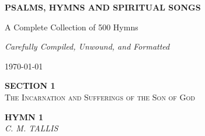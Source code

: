 \documentclass[11pt,a4paper]{article}
\begin{document}
\begin{titlepage}
    \centering
    \vspace*{4cm}
    {\Huge \textbf{PSALMS, HYMNS AND SPIRITUAL SONGS}\par}
    \vspace{1.5cm}
    {\Large A Complete Collection of 500 Hymns\par}
    \vspace{2cm}
    {\large \textit{Carefully Compiled, Unwound, and Formatted}\par}
    \vfill
    {\large \today\par}
\end{titlepage}

\newpage
\thispagestyle{empty}
\vspace*{3.5cm}
\begin{center}
    {\LARGE \textbf{SECTION 1}}\\[0.8em]
    {\Large \textsc{The Incarnation and Sufferings of the Son of God}}
\end{center}
\vspace{3.5cm}

\newpage
\begin{center}
    {\Large \textbf{HYMN 1}}
    \\
    \textit{C. M. TALLIS}
\end{center}
\vspace{1em}
\end{document}
